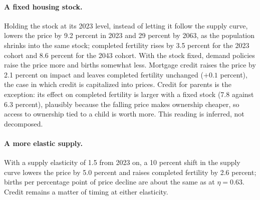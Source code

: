 \paragraph{A fixed housing stock.} Holding the stock at its 2023 level,
instead of letting it follow the supply curve, lowers the price by 9.2 percent
in 2023 and 29 percent by 2063, as the population shrinks into the same stock;
completed fertility rises by 3.5 percent for the 2023 cohort and 8.6 percent
for the 2043 cohort. With the stock fixed, demand policies raise the price
more and births somewhat less. Mortgage credit raises the price by 2.1
percent on impact and leaves completed fertility unchanged ($+0.1$ percent),
the case in which credit is capitalized into prices. Credit for parents is the
exception: its effect on completed fertility is larger with a fixed stock
(7.8 against 6.3 percent), plausibly because the falling price makes ownership
cheaper, so access to ownership tied to a child is worth more. This reading is
inferred, not decomposed.

\paragraph{A more elastic supply.} With a supply elasticity of 1.5 from 2023 on,
a 10 percent shift in the supply curve lowers the price by 5.0 percent and
raises completed fertility by 2.6 percent; births per percentage point of
price decline are about the same as at $\eta=0.63$. Credit remains a matter of
timing at either elasticity.

